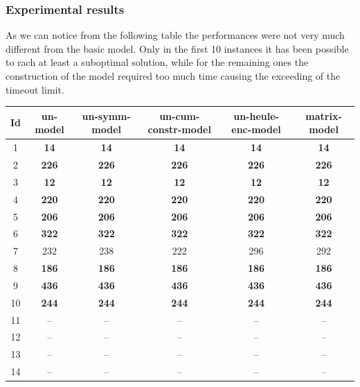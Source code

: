 \subsubsection*{Experimental results}

As we can notice from the following table the performances were not very much different from the basic model. Only in the first 10 instances it has been possible to rach at least a suboptimal solution, while for the remaining ones the construction of the model required too much time causing the exceeding of the timeout limit.
\begin{table}[h]
    \centering
    \begin{tabular}{cccccc}
            \toprule
            Id & un-model & un-symm-model & un-cum-constr-model & un-heule-enc-model & matrix-model \\ 
            \midrule
            1 & \textbf{14} &       \textbf{14} &   \textbf{14} &   \textbf{14} &   \textbf{14} \\ 
            2 & \textbf{226} &      \textbf{226} &  \textbf{226} &  \textbf{226} &  \textbf{226} \\ 
            3 & \textbf{12} &       \textbf{12} &   \textbf{12} &   \textbf{12} &   \textbf{12} \\ 
            4 & \textbf{220} &      \textbf{220} &  \textbf{220} &  \textbf{220} &  \textbf{220} \\ 
            5 & \textbf{206} &      \textbf{206} &  \textbf{206} &  \textbf{206} &  \textbf{206} \\ 
            6 & \textbf{322} &      \textbf{322} &  \textbf{322} &  \textbf{322} &  \textbf{322} \\ 
            7 & 232 &       238 &   222 &   296 &   292 \\ 
            8 & \textbf{186} &      \textbf{186} &  \textbf{186} &  \textbf{186} &  \textbf{186} \\ 
            9 & \textbf{436} &      \textbf{436} &  \textbf{436} &  \textbf{436} &  \textbf{436} \\ 
            10 & \textbf{244} &     \textbf{244} &  \textbf{244} &  \textbf{244} &  \textbf{244} \\ 
            11 & -- &       -- &    -- &    -- &    -- \\ 
            12 & -- &       -- &    -- &    -- &    -- \\ 
            13 & -- &       -- &    -- &    -- &    -- \\ 
            14 & -- &       -- &    -- &    -- &    -- \\ 

\end{tabular}
\end{table}
